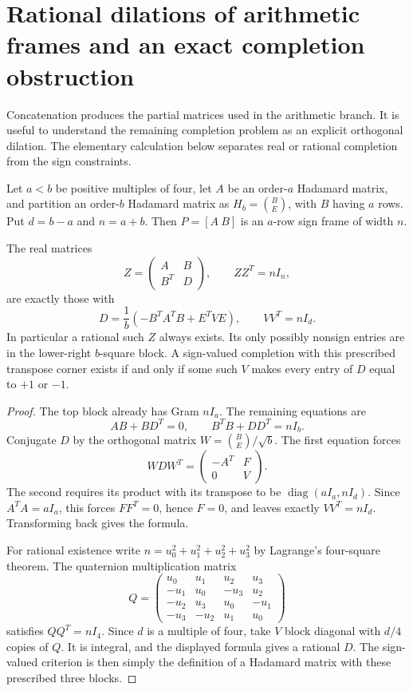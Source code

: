 \section{Rational dilations of arithmetic frames and an exact completion obstruction}
\label{sec:rational-dilations}

Concatenation produces the partial matrices used in the arithmetic
branch. It is useful to understand the remaining completion problem
as an explicit orthogonal dilation. The elementary calculation below
separates real or rational completion from the sign constraints.


Let $a<b$ be positive multiples of four, let $A$ be an order-$a$
Hadamard matrix, and partition an order-$b$ Hadamard matrix as
$H_b=\binom{B}{E}$, with $B$ having $a$ rows. Put $d=b-a$ and $n=a+b$.
Then $P=[A\ B]$ is an $a$-row sign frame of width $n$.

\begin{theorem}
\label{dil:parameterization}
The real matrices
\[
 Z=\begin{pmatrix}A&B\\B^T&D\end{pmatrix},\qquad ZZ^T=nI_n,
\]
are exactly those with
\[
 \boxed{D=\frac1b\left(-B^TA^TB+E^TVE\right),\qquad
                         VV^T=nI_d.}
\]
In particular a rational such $Z$ always exists. Its only possibly
nonsign entries are in the lower-right $b$-square block.
A sign-valued completion with this prescribed transpose corner
exists if and only if some such $V$ makes every entry of $D$ equal
to $+1$ or $-1$.
\end{theorem}
\begin{proof}
The top block already has Gram $nI_a$. The remaining equations are
\[
 AB+BD^T=0,\qquad B^TB+DD^T=nI_b.
\]
Conjugate $D$ by the orthogonal matrix
$W=\binom{B}{E}/\sqrt b$. The first equation forces
\[
 WDW^T=\begin{pmatrix}-A^T&F\\0&V\end{pmatrix}.
\]
The second requires its product with its transpose to be
$\operatorname{diag}(aI_a,nI_d)$.
Since $A^TA=aI_a$, this forces $FF^T=0$, hence $F=0$,
and leaves exactly $VV^T=nI_d$. Transforming back gives the formula.

For rational existence write $n=u_0^2+u_1^2+u_2^2+u_3^2$ by
Lagrange's four-square theorem. The quaternion multiplication matrix
\[
 Q=\begin{pmatrix}
 u_0&u_1&u_2&u_3\\
 -u_1&u_0&-u_3&u_2\\
 -u_2&u_3&u_0&-u_1\\
 -u_3&-u_2&u_1&u_0
 \end{pmatrix}
\]
satisfies $QQ^T=nI_4$. Since $d$ is a multiple of four, take $V$
block diagonal with $d/4$ copies of $Q$. It is integral, and the
displayed formula gives a rational $D$. The sign-valued criterion
is then simply the definition of a Hadamard matrix with these
prescribed three blocks.
\end{proof}

